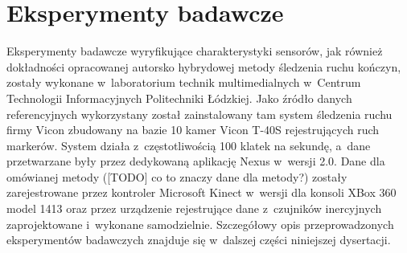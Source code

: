 \chapter{Eksperymenty badawcze}\label{chap:experiments}
Eksperymenty badawcze wyryfikujące charakterystyki sensorów, jak również dokładności opracowanej autorsko hybrydowej metody śledzenia ruchu kończyn, zostały wykonane w~laboratorium technik multimedialnych w~Centrum Technologii Informacyjnych Politechniki Łódzkiej. Jako źródło danych referencyjnych wykorzystany został zainstalowany tam system śledzenia ruchu firmy Vicon zbudowany na bazie 10 kamer Vicon T-40S \cite{ViconSpec} rejestrujących ruch markerów. System działa z~częstotliwością 100 klatek na sekundę, a~dane przetwarzane były przez dedykowaną aplikację Nexus w~wersji 2.0. Dane dla omówianej metody ([TODO] co to znaczy dane dla metody?) zostały zarejestrowane przez kontroler Microsoft Kinect w~wersji dla konsoli XBox 360 model 1413 oraz przez urządzenie rejestrujące dane z~czujników inercyjnych zaprojektowane i~wykonane samodzielnie. Szczegółowy opis przeprowadzonych eksperymentów badawczych znajduje się w~dalszej części niniejszej dysertacji.

